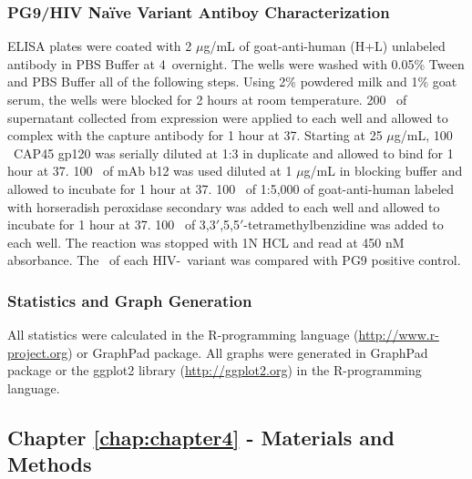 \subsubsection{PG9/HIV Na\"ive Variant Antiboy Characterization}
ELISA plates were coated with 2 $\mu$g/mL of goat-anti-human (H+L) unlabeled antibody in PBS Buffer at 4\degree~overnight. The wells were washed with 0.05\% Tween and PBS Buffer all of the following steps. Using 2\% powdered milk and 1\% goat serum, the wells were blocked for 2 hours at room temperature. 200 \microliter~of supernatant collected from expression were applied to each well and allowed to complex with the capture antibody for 1 hour at 37\degree. Starting at 25 $\mu$g/mL, 100 \microliter~CAP45 gp120 was serially diluted at 1:3 in duplicate and allowed to bind for 1 hour at 37\degree. 100 \microliter~of mAb b12 was used diluted at 1 $\mu$g/mL in blocking buffer and allowed to incubate for 1 hour at 37\degree. 100 \microliter~of 1:5,000 of goat-anti-human labeled with horseradish peroxidase secondary was added to each well and allowed to incubate for 1 hour at 37\degree. 100 \microliter~of 3,3$'$,5,5$'$-tetramethylbenzidine was added to each well. The reaction was stopped with 1N HCL and read at 450 nM absorbance. The \ec~of each HIV-\naive~variant was compared with PG9 positive control.


\subsubsection{Statistics and Graph Generation}
All statistics were calculated in the R-programming language (\url{http://www.r-project.org}) or GraphPad package. All graphs were generated in GraphPad package or the ggplot2 library (\url{http://ggplot2.org}) in the R-programming language.

\clearpage

\subsection{Chapter \ref{chap:chapter4} - Materials and Methods}
\par\vspace{10pt}

